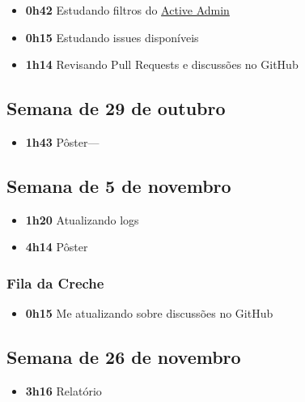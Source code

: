 \begin{itemize}
\tightlist
\item
  \textbf{0h42} Estudando filtros do
  \href{https://activeadmin.info/}{Active Admin}
\item
  \textbf{0h15} Estudando issues disponíveis
\item
  \textbf{1h14} Revisando Pull Requests e discussões no GitHub
\end{itemize}

\hypertarget{semana-de-29-de-outubro}{%
\subsection{Semana de 29 de outubro}\label{semana-de-29-de-outubro}}

\begin{itemize}
\tightlist
\item
  \textbf{1h43} Pôster---
\end{itemize}

\hypertarget{semana-de-5-de-novembro}{%
\subsection{Semana de 5 de novembro}\label{semana-de-5-de-novembro}}

\begin{itemize}
\tightlist
\item
  \textbf{1h20} Atualizando logs
\item
  \textbf{4h14} Pôster
\end{itemize}

\hypertarget{fila-da-creche-5}{%
\subsubsection{Fila da Creche}\label{fila-da-creche-5}}

\begin{itemize}
\tightlist
\item
  \textbf{0h15} Me atualizando sobre discussões no GitHub
\end{itemize}

\hypertarget{semana-de-26-de-novembro}{%
\subsection{Semana de 26 de novembro}\label{semana-de-26-de-novembro}}

\begin{itemize}
\tightlist
\item
  \textbf{3h16} Relatório
\end{itemize}
